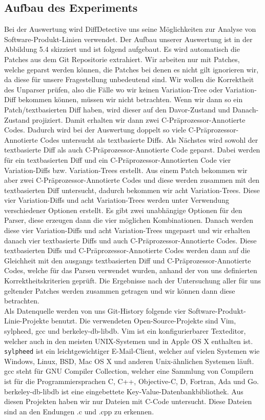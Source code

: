 \subsection{Aufbau des Experiments}
Bei der Auswertung wird DiffDetective uns seine Möglichkeiten zur Analyse von Software-Produkt-Linien verwendet. Der Aufbau unserer Auswertung ist in der Abbildung 5.4 skizziert und ist folgend aufgebaut. Es wird automatisch die Patches aus dem Git Repositorie extrahiert. Wir arbeiten nur mit Patches, welche geparst werden können, die Patches bei denen es nicht gilt ignorieren wir, da diese für unsere Fragestellung unbedeutend sind. Wir wollen die Korrektheit des Unparser prüfen, also die Fälle wo wir keinen Variation-Tree oder Variation-Diff bekommen können, müssen wir nicht betrachten. Wenn wir dann so ein Patch/textbasierten Diff haben, wird dieser auf den Davor-Zustand und Danach-Zustand projiziert. Damit erhalten wir dann zwei C-Präprozessor-Annotierte Codes. Dadurch wird bei der Auswertung doppelt so viele C-Präprozessor-Annotierte Codes untersucht als textbasierte Diffs. Als Nächstes wird sowohl der textbasierte Diff als auch C-Präprozessor-Annotierte Code geparst. Dabei werden für ein textbasierten Diff und ein C-Präprozessor-Annotierten Code vier Variation-Diffs bzw. Variation-Trees erstellt. Aus einem Patch bekommen wir aber zwei C-Präprozessor-Annotierte Codes und diese werden zusammen mit den textbasierten Diff untersucht, dadurch bekommen wir acht Variation-Trees. Diese vier Variation-Diffs und acht Variation-Trees werden unter Verwendung verschiedener Optionen erstellt. Es gibt zwei unabhängige Optionen für den Parser, diese erzeugen dann die vier möglichen Kombinationen. Danach werden diese vier Variation-Diffs und acht Variation-Trees ungepasrt und wir erhalten danach vier textbasierte Diffs und auch C-Präprozessor-Annotierte Codes. Diese textbasierten Diffs und C-Präprozessor-Annotierte Codes werden dann auf die Gleichheit mit den ausgangs textbasierten Diff und C-Präprozessor-Annotierte Codes, welche für das Parsen verwendet wurden, anhand der von uns definierten Korrektheitskriterien geprüft. Die Ergebnisse nach der Untersuchung aller für uns geltender Patches werden zusammen getragen und wir können dann diese betrachten.\\

Als Datenquelle werden von uns Git-History folgende vier Software-Produkt-Linie-Projekte benutzt. Die verwendeten Open-Source-Projekte sind Vim, sylpheed, gcc und berkeley-db-libdb. Vim ist ein konfigurierbarer Texteditor, welcher auch in den meisten UNIX-Systemen und in Apple OS X enthalten ist. \texttt{sylpheed} ist ein leichtgewichtiger E-Mail-Client, welcher auf vielen Systemen wie Windows, Linux, BSD, Mac OS X und anderen Unix-ähnlichen Systemen läuft. gcc steht für GNU Compiler Collection, welcher eine Sammlung von Compilern ist für die Programmiersprachen C, C++, Objective-C, D, Fortran, Ada und Go. berkeley-db-libdb ist eine eingebettete Key-Value-Datenbankbibliothek. Aus diesen Projekten haben wir nur Dateien mit C-Code untersucht. Diese Dateien sind an den Endungen .c und .cpp zu erkennen. 

